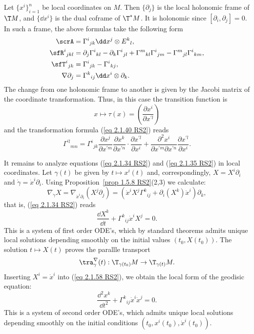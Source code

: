 \begin{rem}\label{rem 2.1.29 RS2}
    Let $\{x^i\}_{i=1}^n$ be local coordinates on $M$. Then $\{\partial_j\}$ is the local holonomic frame of $\T M$, and $\{\dd x^i\}$ is the dual coframe of $\T^\ast M$. It is holonomic since $[\partial_i,\partial_j]=0$. In such a frame, the above formulas take the following form 
    \begin{align}
        \scrA&=\Gamma^i{}_{jk}\dd x^j\otimes E^k{}_l,\\
        \sfR^i{}_{jkl}&=\partial_j\Gamma^i{}_{kl}-\partial_k\Gamma^i{}_{jl}+\Gamma^m{}_{kl}\Gamma^i{}_{jm}-\Gamma^m{}_{jl}\Gamma^i{}_{km},\\
        \sfT^i{}_{jk}&=\Gamma^i{}_{jk}-\Gamma^i{}_{kj},\\
        \nabla\partial_j&=\Gamma^k{}_{ij}\dd x^i\otimes\partial_k.
    \end{align}
    The change from one holonomic frame to another is given by the Jacobi matrix of the coordinate transformation. Thus, in this case the transition function is 
    \[x\mapsto \tau(x)=\left(\frac{\partial x^i}{\partial x^{\prime l}}\right)\]
    and the transformation formula (\ref{eq 2.1.40 RS2}) reads 
    \[\Gamma^{\prime l}{}_{mn}=
    \Gamma^i{}_{jk}\frac{\partial x^j}{\partial x^{\prime m}}  \frac{\partial x^k}{\partial x^{\prime n}}\cdot \frac{\partial x^{\prime l}}{\partial x^i}+
    \frac{\partial^2 x^i}{\partial x^{\prime m}\partial x^{\prime n}}\frac{\partial x^{\prime l}}{\partial x^i}.
    \]
\end{rem}


It remains to analyze equations (\ref{eq 2.1.34 RS2}) and (\ref{eq 2.1.35 RS2}) in local coordinates. Let $\gamma(t)$ be given by $t\mapsto x^i(t)$ and, correspondingly, $X=X^i\partial_i$ and $\dot\gamma=\dot x^i\partial_i$. Using Proposition~\ref{prop 1.5.8 RS2}(2,3) we calculate:
\[\nabla_{\dot\gamma}X=\nabla_{\dot x^i\partial_i}(X^j\partial_j)=(\dot x^iX^j\Gamma^k{}_{ij}+\partial_i(X^k)\dot x^i)\partial_k,\]
that is, (\ref{eq 2.1.34 RS2}) reads 
\[\frac{\dd X^k}{\dd t}+\Gamma^k{}_{ij}\dot x^i X^j=0.\label{eq 2.1.58 RS2}\]
This is a system of first order ODE's, which by standard theorems admits unique local solutions depending smoothly on the initial values $(t_0,X(t_0))$. The solution $t\mapsto X(t)$ proves the parallle transport 
\[\tra_{\gamma}^{\nabla}(t):\T_{\gamma(t_0)}M\to \T_{\gamma(t)}M.\]
Inserting $X^i=\dot x^i$ into (\ref{eq 2.1.58 RS2}), we obtain the local form of the geodisic equation:
\[\frac{\dd^2 x^k}{\dd t^2}+\Gamma^k{}_{ij}\dot x^i\dot x^j=0.\]
This is a system of second order ODE's, which admits unique local solutions depending smoothly on the initial conditions $(t_0,x^i(t_0),\dot x^i(t_0))$.

